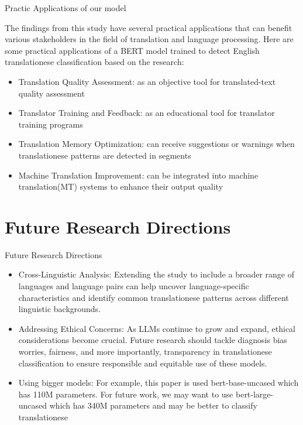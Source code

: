 \documentclass[
]{beamer}
\begin{document}
\begin{frame}{Practic Applications of our model}

\hspace{0.4cm} The findings from this study have several practical applications that can benefit various stakeholders in the field of translation and language processing. Here are some practical applications of a BERT model trained to detect English translationese classification based on the research:
\begin{itemize}
    \item Translation Quality Assessment: as an objective tool for translated-text quality assessment
    \item Translator Training and Feedback: as an educational tool for translator training programs
    \item Translation Memory Optimization: can receive suggestions or warnings when translationese patterns are detected in segments
    \item Machine Translation Improvement: can be integrated into machine translation(MT) systems to enhance their output quality
\end{itemize}

\end{frame}




\section[Future Research Directions]{Future Research Directions}

\begin{frame}{Future Research Directions}

\begin{itemize}
    \item Cross-Linguistic Analysis: Extending the study to include a broader range of languages and language pairs can help uncover language-specific characteristics and identify common translationese patterns across different linguistic backgrounds.
    
    \item Addressing Ethical Concerns: As LLMs continue to grow and expand, ethical considerations become crucial. Future research should tackle diagnosis bias worries, fairness, and more importantly, transparency in translationese classification to ensure responsible and equitable use of these models.

    \item Using bigger models: For example, this paper is used bert-base-uncased which has 110M parameters. For future work, we may want to use bert-large-uncased which has 340M parameters and may be better to classify translationese
\end{itemize}

\end{frame}
\end{document}
